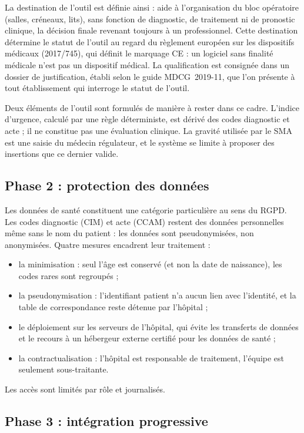 \documentclass[11pt,a4paper]{article}
\begin{document}
La destination de l'outil est définie ainsi : aide à l'organisation du bloc opératoire (salles, créneaux, lits), sans fonction de diagnostic, de traitement ni de pronostic clinique, la décision finale revenant toujours à un professionnel. Cette destination détermine le statut de l'outil au regard du règlement européen sur les dispositifs médicaux (2017/745), qui définit le marquage CE : un logiciel sans finalité médicale n'est pas un dispositif médical. La qualification est consignée dans un dossier de justification, établi selon le guide MDCG~2019-11, que l'on présente à tout établissement qui interroge le statut de l'outil.

Deux éléments de l'outil sont formulés de manière à rester dans ce cadre. L'indice d'urgence, calculé par une règle déterministe, est dérivé des codes diagnostic et acte ; il ne constitue pas une évaluation clinique. La gravité utilisée par le SMA est une saisie du médecin régulateur, et le système se limite à proposer des insertions que ce dernier valide.

\subsection{Phase 2 : protection des données}

Les données de santé constituent une catégorie particulière au sens du RGPD. Les codes diagnostic (CIM) et acte (CCAM) restent des données personnelles même sans le nom du patient : les données sont pseudonymisées, non anonymisées. Quatre mesures encadrent leur traitement :
\begin{itemize}
\item la minimisation : seul l'âge est conservé (et non la date de naissance), les codes rares sont regroupés ;
\item la pseudonymisation : l'identifiant patient n'a aucun lien avec l'identité, et la table de correspondance reste détenue par l'hôpital ;
\item le déploiement sur les serveurs de l'hôpital, qui évite les transferts de données et le recours à un hébergeur externe certifié pour les données de santé ;
\item la contractualisation : l'hôpital est responsable de traitement, l'équipe est seulement sous-traitante.
\end{itemize}
Les accès sont limités par rôle et journalisés.

\subsection{Phase 3 : intégration progressive}
\end{document}
